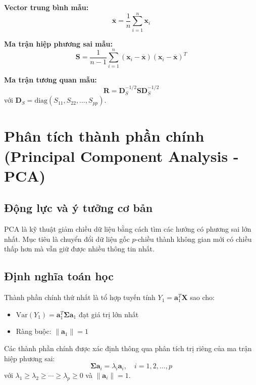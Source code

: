 \textbf{Vector trung bình mẫu:}
\[
\overline{\mathbf{x}} = \frac{1}{n}\sum_{i=1}^n \mathbf{x}_i
\]

\textbf{Ma trận hiệp phương sai mẫu:}
\[
\mathbf{S} = \frac{1}{n-1}\sum_{i=1}^n (\mathbf{x}_i - \overline{\mathbf{x}})(\mathbf{x}_i - \overline{\mathbf{x}})^T
\]

\textbf{Ma trận tương quan mẫu:}
\[
\mathbf{R} = \mathbf{D}_S^{-1/2} \mathbf{S} \mathbf{D}_S^{-1/2}
\]
với $\mathbf{D}_S = \text{diag}(S_{11}, S_{22}, \ldots, S_{pp})$.

\section{Phân tích thành phần chính (Principal Component Analysis - PCA)}

\subsection{Động lực và ý tưởng cơ bản}
PCA là kỹ thuật giảm chiều dữ liệu bằng cách tìm các hướng có phương sai lớn nhất. Mục tiêu là chuyển đổi dữ liệu gốc $p$-chiều thành không gian mới có chiều thấp hơn mà vẫn giữ được nhiều thông tin nhất.

\subsection{Định nghĩa toán học}
\begin{dn}
Thành phần chính thứ nhất là tổ hợp tuyến tính $Y_1 = \mathbf{a}_1^T\mathbf{X}$ sao cho:
\begin{itemize}
    \item $\text{Var}(Y_1) = \mathbf{a}_1^T\boldsymbol{\Sigma}\mathbf{a}_1$ đạt giá trị lớn nhất
    \item Ràng buộc: $\|\mathbf{a}_1\| = 1$
\end{itemize}
\end{dn}

\begin{dl}
Các thành phần chính được xác định thông qua phân tích trị riêng của ma trận hiệp phương sai:
\[
\boldsymbol{\Sigma}\mathbf{a}_i = \lambda_i\mathbf{a}_i, \quad i = 1, 2, \ldots, p
\]
với $\lambda_1 \geq \lambda_2 \geq \cdots \geq \lambda_p \geq 0$ và $\|\mathbf{a}_i\| = 1$.
\end{dl}

